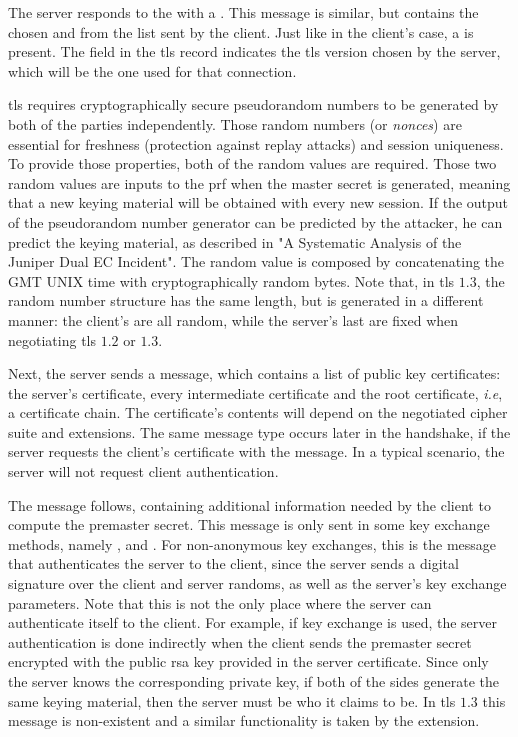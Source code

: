 \documentclass{llncs}
\begin{document}
The server responds to the  with a .
This message is similar, but contains the chosen 
and  from the list sent by the client. Just like in the client's case, a 
is present. The  field in the \gls{tls} record indicates
the \gls{tls} version chosen by the server, which will be the one used for
that connection.

\gls{tls} requires cryptographically secure pseudorandom numbers to be generated
by both of the parties independently. Those random numbers (or \textit{nonces}) are essential for freshness
(protection against replay attacks) and session uniqueness. To provide those
properties, both of the random values are required. Those two random values are inputs to the \gls{prf} when the master secret is generated, meaning
that a new keying material will be obtained with every new session. If the output of the pseudorandom number generator
can be predicted by the attacker, he can predict the keying material, as described
in "A Systematic Analysis of the Juniper Dual EC Incident"\cite{DualECJu15:online}.
The  random value is composed by concatenating the 
GMT UNIX time with  cryptographically random bytes. Note that, in \gls{tls} $1.3$,
the random number structure has the same length, but is generated in a different manner:
the client's  are all random, while the server's last 
are fixed when negotiating \gls{tls} $1.2$ or $1.3$.

Next, the server sends a  message, which contains a list
of public key certificates: the server's certificate,
every intermediate certificate and the root certificate, \textit{i.e}, a certificate chain. The certificate's contents
will depend on the negotiated cipher suite and extensions.
The same message type occurs later in the handshake, if the server requests the client's certificate with the
 message. In a typical scenario, the
server will not request client authentication.

The  message follows, containing additional information
needed by the client to compute the premaster secret. This message
is only sent in some key exchange methods, namely , 
and . For non-anonymous key exchanges, this is the message that authenticates the server to the client,
since the server sends a digital signature over the client and server randoms, as well as the server's key exchange parameters. Note that this is not the only place where the
server can authenticate itself to the client. For example, if  key
exchange is used, the server authentication is done indirectly when the client
sends the premaster secret encrypted with the public \gls{rsa} key provided in the
server certificate. Since only the server knows the corresponding private key, if
both of the sides generate the same keying material, then the server must be who
it claims to be. In \gls{tls} $1.3$ this message is non-existent and a similar
functionality is taken by the  extension.
\end{document}

